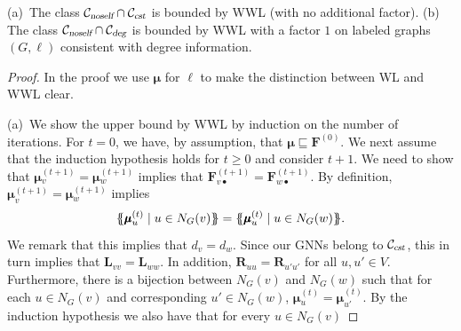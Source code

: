 \begin{proposition}
(a)~The class  ${\cal C}_{\textsl{noself}}\cap {\cal C}_{\textsl{cst}}$ is bounded by WWL (with no additional factor). (b)~
The class ${\cal C}_{\textsl{noself}}\cap {\cal C}_{\textsl{deg}}$ is bounded by WWL with a factor $1$ on labeled graphs $(G,\pmb{\ell})$ consistent with degree information.
\end{proposition}
\begin{proof}
In the proof we use $\pmb{\mu}$ for $\pmb{\ell}$ to make the distinction between WL and WWL clear.

(a)~We show the upper bound by WWL by induction on the number of iterations. For $t=0$, we have, by assumption, that 
$\pmb{\mu}\sqsubseteq \mathbf{F}^{(0)}$. 
We next assume that the induction hypothesis holds for $t\geq 0$ and consider $t+1$. We need to show that 
$\pmb{\mu}{}^{(t+1)}_v=\pmb{\mu}{}^{(t+1)}_w$ implies that $\mathbf{F}^{(t+1)}_{v\bullet}=\mathbf{F}^{(t+1)}_{w\bullet}$. By definition,
$\pmb{\mu}^{(t+1)}_v=\pmb{\mu}{}^{(t+1)}_w$ implies
$$
\ldbl \pmb{\mu}{}^{(t)}_u \st u \in N_G(v) \rdbl=
 \ldbl \pmb{\mu}{}^{(t)}_u \st u \in N_G(w) \rdbl.$$
We remark that this implies that $d_v=d_w$. Since our GNNs belong to ${\cal C}_{\textsl{cst}}$, this in turn implies that $\mathbf{L}_{vv}=\mathbf{L}_{ww}$.
In addition, $\mathbf{R}_{uu}=\mathbf{R}_{u'u'}$ for all $u,u'\in V$.
%
Furthermore, there is a bijection between $N_G(v)$ and $N_G(w)$ such that for each $u\in N_G(v)$ and corresponding $u'\in N_G(w)$, $\pmb{\mu}{}^{(t)}_u=\pmb{\mu}{}^{(t)}_{u'}$.
By the induction hypothesis we also have that for  every $u\in N_G(v)$

\end{proof}
